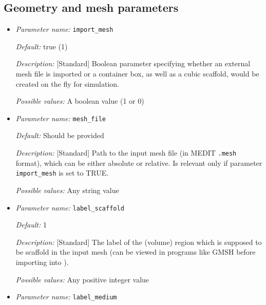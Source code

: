 \subsection{Geometry and mesh parameters}
\label{parameters:mesh}

\begin{itemize}

\item {\it Parameter name:} {\tt import\_mesh}
\label{parameters:import_mesh}


{\it Default:} true (1)

{\it Description:} [Standard] Boolean parameter specifying whether an external mesh file is imported or a container box, as well as a cubic scaffold, would be created on the fly for simulation.

{\it Possible values:} A boolean value (1 or 0)

\item {\it Parameter name:} {\tt mesh\_file}
\label{parameters:mesh_file}


{\it Default:} Should be provided

{\it Description:} [Standard] Path to the input mesh file (in MEDIT {\tt .mesh} format), which can be either absolute or relative. Is relevant only if parameter {\tt import\_mesh} is set to TRUE.

{\it Possible values:} Any string value 


\item {\it Parameter name:} {\tt label\_scaffold}
\label{parameters:label_scaffold}


{\it Default:} 1

{\it Description:} [Standard] The label of the (volume) region which is supposed to be scaffold in the input mesh (can be viewed in programs like GMSH before importing into \biodeg{}). 

{\it Possible values:} Any positive integer value 


\item {\it Parameter name:} {\tt label\_medium}
\label{parameters:label_medium}


\end{itemize}
